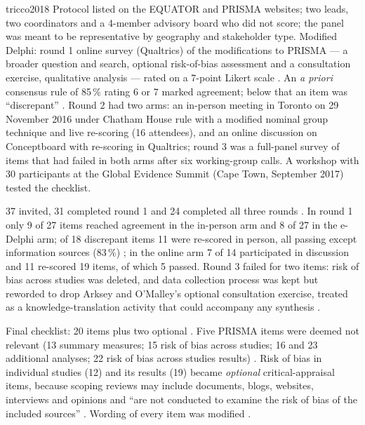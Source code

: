 \begin{papercard}{tricco2018}
 Protocol listed on the EQUATOR and PRISMA websites; two leads, two coordinators and a 4-member advisory board who did not score; the panel was meant to be representative by geography and stakeholder type. Modified Delphi: round 1 online survey (Qualtrics) of the modifications to PRISMA --- a broader question and search, optional risk-of-bias assessment and a consultation exercise, qualitative analysis --- rated on a 7-point Likert scale . An \emph{a priori} consensus rule of 85\,\% rating 6 or 7 marked agreement; below that an item was ``discrepant'' . Round 2 had two arms: an in-person meeting in Toronto on 29 November 2016 under Chatham House rule with a modified nominal group technique and live re-scoring (16 attendees), and an online discussion on Conceptboard with re-scoring in Qualtrics; round 3 was a full-panel survey of items that had failed in both arms after six working-group calls. A workshop with 30 participants at the Global Evidence Summit (Cape Town, September 2017) tested the checklist.

 37 invited, 31 completed round 1 and 24 completed all three rounds . In round 1 only 9 of 27 items reached agreement in the in-person arm and 8 of 27 in the e-Delphi arm; of 18 discrepant items 11 were re-scored in person, all passing except information sources (83\,\%) ; in the online arm 7 of 14 participated in discussion and 11 re-scored 19 items, of which 5 passed. Round 3 failed for two items: risk of bias across studies was deleted, and data collection process was kept but reworded to drop Arksey and O'Malley's optional consultation exercise, treated as a knowledge-translation activity that could accompany any synthesis .

 Final checklist: 20 items plus two optional . Five PRISMA items were deemed not relevant (13 summary measures; 15 risk of bias across studies; 16 and 23 additional analyses; 22 risk of bias across studies results) . Risk of bias in individual studies (12) and its results (19) became \emph{optional} critical-appraisal items, because scoping reviews may include documents, blogs, websites, interviews and opinions and ``are not conducted to examine the risk of bias of the included sources'' . Wording of every item was modified .


\end{papercard}
